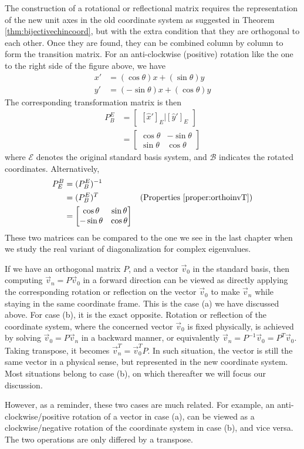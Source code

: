 The construction of a rotational or reflectional matrix requires the representation of the new unit axes in the old coordinate system as suggested in Theorem \ref{thm:bijectivechincoord}, but with the extra condition that they are orthogonal to each other. Once they are found, they can be combined column by column to form the transition matrix. For an anti-clockwise (positive) rotation like the one to the right side of the figure above, we have
\begin{align*}
x' &= (\cos \theta) x + (\sin \theta) y \\
y' &= (- \sin \theta) x + (\cos \theta) y
\end{align*}
The corresponding transformation matrix is then
\begin{align*}
P_B^E &= \begin{bmatrix}
[\hat{x}']_E|[\hat{y}']_E    
\end{bmatrix} \\
&= \begin{bmatrix}
\cos \theta & -\sin \theta \\
\sin \theta & \cos \theta
\end{bmatrix}
\end{align*}
where $\mathcal{E}$ denotes the original standard basis system, and $\mathcal{B}$ indicates the rotated coordinates. Alternatively,
\begin{align*}
P_E^B &= (P_B^E)^{-1} \\
&= (P_B^E)^T & \text{(Properties \ref{proper:orthoinvT})}\\
&= \begin{bmatrix}
\cos \theta & \sin \theta \\
-\sin \theta & \cos \theta
\end{bmatrix}
\end{align*}
These two matrices can be compared to the one we see in the last chapter when we study the real variant of diagonalization for complex eigenvalues. \par
If we have an orthogonal matrix $P$, and a vector $\vec{v}_0$ in the standard basis, then computing $\vec{v}_n = P\vec{v}_0$ in a forward direction can be viewed as directly applying the corresponding rotation or reflection on the vector $\vec{v}_0$ to make $\vec{v}_n$ while staying in the same coordinate frame. This is the case (a) we have discussed above. For case (b), it is the exact opposite. Rotation or reflection of the coordinate system, where the concerned vector $\vec{v}_0$ is fixed physically, is achieved by solving $\vec{v}_0 = P\vec{v}_n$ in a backward manner, or equivalently $\vec{v}_n = P^{-1}\vec{v}_0 = P^T\vec{v}_0$. Taking transpose, it becomes $\vec{v}_n^T = \vec{v}_0^T P$. In such situation, the vector is still the same vector in a physical sense, but represented in the new coordinate system. Most situations belong to case (b), on which thereafter we will focus our discussion.
\par
However, as a reminder, these two cases are much related. For example, an anti-clockwise/positive rotation of a vector in case (a), can be viewed as a clockwise/negative rotation of the coordinate system in case (b), and vice versa. The two operations are only differed by a transpose.

